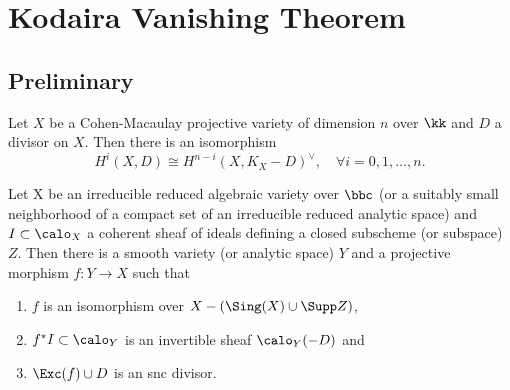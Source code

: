 \section{Kodaira Vanishing Theorem}

\subsection{Preliminary}


    \begin{theorem}\label{thm: Serre duality for line bundles}
        Let \(X\) be a Cohen-Macaulay projective variety of dimension \(n\) over \(\kk\) and \(D\) a divisor on \(X\).
        Then there is an isomorphism
        \[
            H^i(X, D) \cong H^{n-i}(X, K_X - D)^\vee, \quad \forall i = 0, 1, \ldots, n.
        \]
    \end{theorem}


    \begin{theorem}\label{thm: log resolution of singularities}
        Let X be an irreducible reduced algebraic variety over $\bbc$ (or a suitably small neighborhood of a compact set of an irreducible reduced analytic space) and $I \subset \calo_X$ a coherent sheaf of ideals defining a closed subscheme (or subspace) $Z$. Then there is a smooth variety (or analytic space) $Y$ and a projective morphism $f: Y \to X$ such that
        \begin{enumerate}
            \item $f$ is an isomorphism over $X - (\Sing(X) \cup \Supp Z)$,
            \item $f^*I \subset \calo_Y$ is an invertible sheaf $\calo_Y(-D)$ and 
            \item $\Exc(f) \cup D$ is an snc divisor.
        \end{enumerate}
    \end{theorem}

